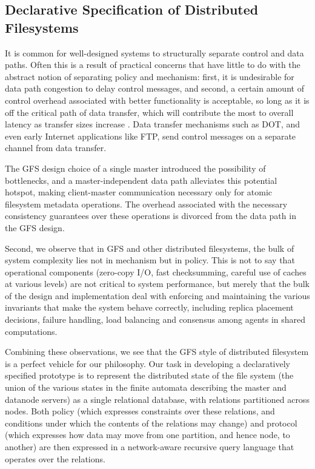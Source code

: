 \documentclass{article}
\begin{document}
\subsection{Declarative Specification of Distributed Filesystems}
It is common for well-designed systems to structurally separate control and data paths.  Often this is a result of practical concerns that have little to do with the abstract notion of separating policy and mechanism: first, it is undesirable for data path congestion to delay control messages, and second, a certain amount of control overhead associated with better functionality is acceptable, so long as it is off the critical path of data transfer, which will contribute the most to overall latency as transfer sizes increase .  Data transfer mechanisms such as DOT, and even early Internet applications like FTP, send control messages on a separate channel from data transfer.

The GFS design choice of a single master introduced the possibility of bottlenecks, and a master-independent data path alleviates this potential hotspot, making client-master communication necessary only for atomic filesystem metadata operations.   The overhead associated with the necessary consistency guarantees over these operations is divorced from the data path in the GFS design.

Second, we observe that in GFS and other distributed filesystems, the bulk of system complexity lies not in mechanism but in policy.  This is not to say that operational components (zero-copy I/O, fast checksumming, careful use of caches at various levels) are not critical to system performance, but merely that the bulk of the design and implementation deal with enforcing and maintaining the various invariants that make the system behave correctly, including replica placement decisions, failure handling, load balancing and consensus among agents in shared computations.

Combining these observations, we see that the GFS style of distributed filesystem is a perfect vehicle for our philosophy.  Our task in developing a declaratively specified prototype is to represent the distributed state of the file system (the union of the various states in the finite automata describing the master and datanode servers) as a single relational database, with relations partitioned across nodes.  Both policy (which expresses constraints over these relations, and conditions under which the contents of the relations may change) and protocol (which expresses how data may move from one partition, and hence node,  to another) are then expressed in a network-aware recursive query language that operates over the relations.
\end{document}
